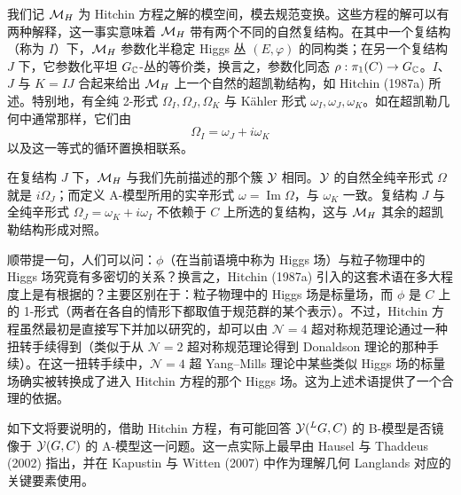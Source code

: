 我们记 $\mathcal{M}_{H}$ 为 Hitchin 方程之解的模空间，模去规范变换。这些方程的解可以有两种解释，这一事实意味着 $\mathcal{M}_{H}$ 带有两个不同的自然复结构。在其中一个复结构（称为 $I$）下，$\mathcal{M}_{H}$ 参数化半稳定 Higgs 丛 $(E,\varphi)$ 的同构类；在另一个复结构 $J$ 下，它参数化平坦 $G_{\mathbb{C}}$-丛的等价类，换言之，参数化同态 $\rho:\pi_{1}(C)\to G_{\mathbb{C}}$。$I$、$J$ 与 $K=IJ$ 合起来给出 $\mathcal{M}_{H}$ 上一个自然的超凯勒结构，如 Hitchin (1987a) 所述。特别地，有全纯 2-形式 $\Omega_{I},\Omega_{J},\Omega_{K}$ 与 Kähler 形式 $\omega_{I},\omega_{J},\omega_{K}$。如在超凯勒几何中通常那样，它们由
\[
\Omega_{I}=\omega_{J}+i\omega_{K}
\]
以及这一等式的循环置换相联系。

在复结构 $J$ 下，$\mathcal{M}_{H}$ 与我们先前描述的那个簇 $\mathcal{Y}$ 相同。$\mathcal{Y}$ 的自然全纯辛形式 $\Omega$ 就是 $i\Omega_{J}$；而定义 A-模型所用的实辛形式 $\omega=\operatorname{Im}\Omega$，与 $\omega_{K}$ 一致。复结构 $J$ 与全纯辛形式 $\Omega_{J}=\omega_{K}+i\omega_{I}$ 不依赖于 $C$ 上所选的复结构，这与 $\mathcal{M}_{H}$ 其余的超凯勒结构形成对照。

\begin{remark}
顺带提一句，人们可以问：$\phi$（在当前语境中称为 Higgs 场）与粒子物理中的 Higgs 场究竟有多密切的关系？换言之，Hitchin (1987a) 引入的这套术语在多大程度上是有根据的？主要区别在于：粒子物理中的 Higgs 场是标量场，而 $\phi$ 是 $C$ 上的 1-形式（两者在各自的情形下都取值于规范群的某个表示）。不过，Hitchin 方程虽然最初是直接写下并加以研究的，却可以由 $\mathcal{N}=4$ 超对称规范理论通过一种扭转手续得到（类似于从 $\mathcal{N}=2$ 超对称规范理论得到 Donaldson 理论的那种手续）。在这一扭转手续中，$\mathcal{N}=4$ 超 Yang–Mills 理论中某些类似 Higgs 场的标量场确实被转换成了进入 Hitchin 方程的那个 Higgs 场。这为上述术语提供了一个合理的依据。
\end{remark}

如下文将要说明的，借助 Hitchin 方程，有可能回答 $\mathcal{Y}({}^{L}G,C)$ 的 B-模型是否镜像于 $\mathcal{Y}(G,C)$ 的 A-模型这一问题。这一点实际上最早由 Hausel 与 Thaddeus (2002) 指出，并在 Kapustin 与 Witten (2007) 中作为理解几何 Langlands 对应的关键要素使用。
